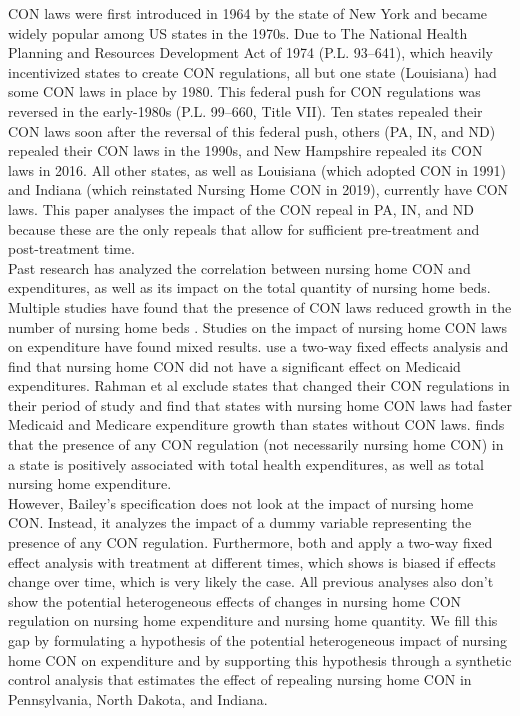 \documentclass[../Main.tex]{subfiles}
\begin{document}
CON laws were first introduced in 1964 by the state of New York and became widely popular among US states in the 1970s. Due to The National Health Planning and Resources Development Act of 1974 (P.L. 93–641), which heavily incentivized states to create CON regulations, all but one state (Louisiana) had some CON laws in place by 1980. This federal push for CON regulations was reversed in the early-1980s (P.L. 99–660, Title VII). Ten states repealed their CON laws soon after the reversal of this federal push, others (PA, IN, and ND) repealed their CON laws in the 1990s, and New Hampshire repealed its CON laws in 2016. All other states, as well as Louisiana (which adopted CON in 1991) and Indiana (which reinstated Nursing Home CON in 2019), currently have CON laws. This paper analyses the impact of the CON repeal in PA, IN, and ND because these are the only repeals that allow for sufficient pre-treatment and post-treatment time.\\
\indent Past research has analyzed the correlation between nursing home CON and expenditures, as well as its impact on the total quantity of nursing home beds. Multiple studies have found that the presence of CON laws reduced growth in the number of nursing home beds \citep{harrington1997effect,swan1991certificate,zinn1994market}. Studies on the impact of nursing home CON laws on expenditure have found mixed results. \citet{grabowski2003effects} use a two-way fixed effects analysis and find that nursing home CON did not have a significant effect on Medicaid expenditures. Rahman et al \citet{rahman2016impact} exclude states that changed their CON regulations in their period of study and find that states with nursing home CON laws had faster Medicaid and Medicare expenditure growth than states without CON laws. \citet{bailey2019can} finds that the presence of any CON regulation (not necessarily nursing home CON) in a state is positively associated with total health expenditures, as well as total nursing home expenditure.\\
\indent However, Bailey’s specification does not look at the impact of nursing home CON. Instead, it analyzes the impact of a dummy variable representing the presence of any CON regulation. Furthermore, both \citet{grabowski2003effects} and \citet{bailey2019can} apply a two-way fixed effect analysis with treatment at different times, which \citet{goodman2021difference} shows is biased if effects change over time, which is very likely the case. All previous analyses also don’t show the potential heterogeneous effects of changes in nursing home CON regulation on nursing home expenditure and nursing home quantity. We fill this gap by formulating a hypothesis of the potential heterogeneous impact of nursing home CON on expenditure and by supporting this hypothesis through a synthetic control analysis that estimates the effect of repealing nursing home CON in Pennsylvania, North Dakota, and Indiana.
\end{document}
